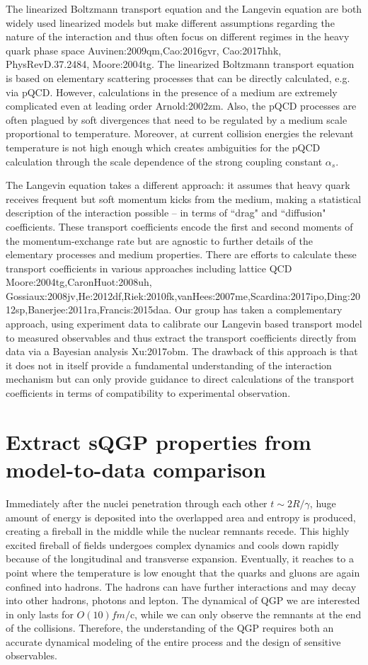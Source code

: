 The linearized Boltzmann transport equation and the Langevin equation are both widely used linearized models but make different assumptions regarding the nature of the interaction and thus often focus on different regimes in the heavy quark phase space {Auvinen:2009qm,Cao:2016gvr, Cao:2017hhk, PhysRevD.37.2484, Moore:2004tg}.
The linearized Boltzmann transport equation is based on elementary scattering processes that can be directly calculated, e.g. via pQCD.
However, calculations in the presence of a medium are extremely complicated even at leading order {Arnold:2002zm}.
Also, the pQCD processes are often plagued by soft divergences that need to be regulated by a medium scale proportional to temperature. Moreover, at current collision energies the relevant temperature is not high enough which creates ambiguities for the pQCD calculation through the scale dependence of the strong coupling constant $\alpha_s$.

The Langevin equation takes a different approach: 
it assumes that heavy quark receives frequent but soft momentum kicks from the medium, making a statistical description of the interaction possible -- in terms of ``drag" and ``diffusion" coefficients.
These transport coefficients encode the first and second moments of the momentum-exchange rate but are agnostic to further details of the elementary processes and medium properties.
There are efforts to calculate these transport coefficients in various approaches including lattice QCD {Moore:2004tg,CaronHuot:2008uh, Gossiaux:2008jv,He:2012df,Riek:2010fk,vanHees:2007me,Scardina:2017ipo,Ding:2012sp,Banerjee:2011ra,Francis:2015daa}. Our group has taken a complementary approach, using experiment data to calibrate our Langevin based transport model to measured observables and thus extract the transport coefficients directly from data via a Bayesian analysis {Xu:2017obm}. The drawback of this approach is that it does not in itself provide a fundamental understanding of the interaction mechanism but can only provide guidance to direct calculations of the transport coefficients in terms of compatibility to experimental observation.

\section{Extract sQGP properties from model-to-data comparison}
Immediately after the nuclei penetration through each other $t\sim 2R/\gamma$, huge amount of energy is deposited into the overlapped area and entropy is produced, creating a fireball in the middle while the nuclear remnants recede.
This highly excited fireball of fields undergoes complex dynamics and cools down rapidly because of the longitudinal and transverse expansion.
Eventually, it reaches to a point where the temperature is low enought that the quarks and gluons are again confined into hadrons. 
The hadrons can have further interactions and may decay into other hadrons, photons and lepton.
The dynamical of QGP we are interested in only lasts for $O(10) fm/$c, while we can only observe the remnants at the end of the collisions.
Therefore, the understanding of the QGP requires both an accurate dynamical modeling of the entire process and the design of sensitive observables.


